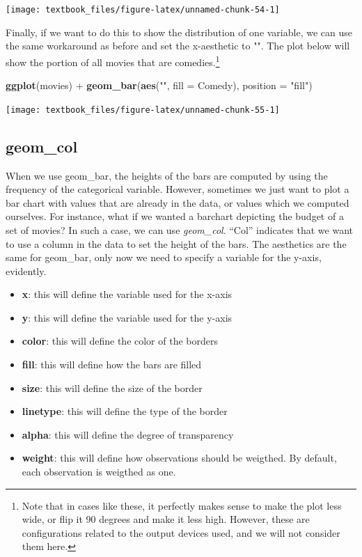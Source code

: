 \documentclass[]{tufte-book}
\newenvironment{Shaded}{}{}
\newcommand{\DataTypeTok}[1]{\textcolor[rgb]{0.56,0.13,0.00}{#1}}
\newcommand{\KeywordTok}[1]{\textcolor[rgb]{0.00,0.44,0.13}{\textbf{#1}}}
\newcommand{\NormalTok}[1]{#1}
\newcommand{\OperatorTok}[1]{\textcolor[rgb]{0.40,0.40,0.40}{#1}}
\newcommand{\StringTok}[1]{\textcolor[rgb]{0.25,0.44,0.63}{#1}}
\providecommand{\tightlist}{%
  \setlength{\itemsep}{0pt}\setlength{\parskip}{0pt}}
\begin{document}
\texttt{[image: textbook\_files/figure-latex/unnamed-chunk-54-1]}

Finally, if we want to do this to show the distribution of one variable, we can use the same workaround as before and set the x-aesthetic to "". The plot below will show the portion of all movies that are comedies.\footnote{Note that in cases like these, it perfectly makes sense to make the plot less wide, or flip it 90 degrees and make it less high. However, these are configurations related to the output devices used, and we will not consider them here.}

\begin{Shaded}
\begin{Highlighting}[]
\KeywordTok{ggplot}\NormalTok{(movies) }\OperatorTok{+}
\StringTok{    }\KeywordTok{geom_bar}\NormalTok{(}\KeywordTok{aes}\NormalTok{(}\StringTok{""}\NormalTok{, }\DataTypeTok{fill =}\NormalTok{ Comedy), }\DataTypeTok{position =} \StringTok{"fill"}\NormalTok{) }
\end{Highlighting}
\end{Shaded}

\texttt{[image: textbook\_files/figure-latex/unnamed-chunk-55-1]}

\hypertarget{geom_col}{%
\subsection{geom\_col}\label{geom_col}}

When we use geom\_bar, the heights of the bars are computed by using the frequency of the categorical variable. However, sometimes we just want to plot a bar chart with values that are already in the data, or values which we computed ourselves. For instance, what if we wanted a barchart depicting the budget of a set of movies? In such a case, we can use \emph{geom\_col}. ``Col'' indicates that we want to use a column in the data to set the height of the bars. The aesthetics are the same for geom\_bar, only now we need to specify a variable for the y-axis, evidently.

\begin{itemize}
\tightlist
\item
  \textbf{x}: this will define the variable used for the x-axis
\item
  \textbf{y}: this will define the variable used for the y-axis
\item
  \textbf{color}: this will define the color of the borders
\item
  \textbf{fill}: this will define how the bars are filled
\item
  \textbf{size}: this will define the size of the border
\item
  \textbf{linetype}: this will define the type of the border
\item
  \textbf{alpha}: this will define the degree of transparency
\item
  \textbf{weight}: this will define how observations should be weigthed. By default, each observation is weigthed as one.
\end{itemize}
\end{document}
